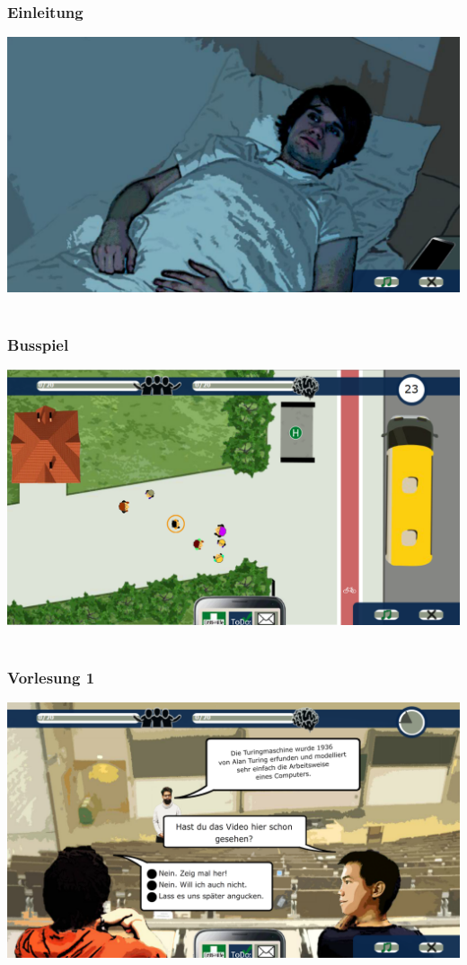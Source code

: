 \documentclass[a4paper, 11pt]{article} %
\begin{document}
\subsubsection{Einleitung}
\includegraphics[scale=0.5]{images/spiel/intro.png}\\\\
\subsubsection{Busspiel}
\includegraphics[scale=0.5]{images/spiel/busspiel.png}\\\\
\subsubsection{Vorlesung 1}
\includegraphics[scale=0.5]{images/spiel/vorlesung1.png}\\\\
\end{document}
